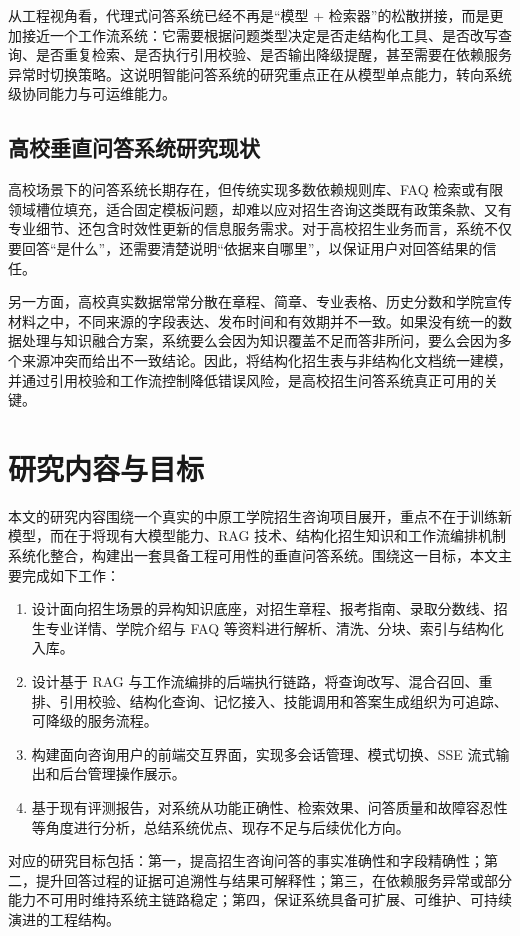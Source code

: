 \documentclass[UTF8,zihao=-4,oneside,fontset=windows]{ctexbook}
\numberwithin{equation}{chapter}
\begin{document}
从工程视角看，代理式问答系统已经不再是“模型 + 检索器”的松散拼接，而是更加接近一个工作流系统：它需要根据问题类型决定是否走结构化工具、是否改写查询、是否重复检索、是否执行引用校验、是否输出降级提醒，甚至需要在依赖服务异常时切换策略。这说明智能问答系统的研究重点正在从模型单点能力，转向系统级协同能力与可运维能力。

\subsection{高校垂直问答系统研究现状}
高校场景下的问答系统长期存在，但传统实现多数依赖规则库、FAQ 检索或有限领域槽位填充，适合固定模板问题，却难以应对招生咨询这类既有政策条款、又有专业细节、还包含时效性更新的信息服务需求。对于高校招生业务而言，系统不仅要回答“是什么”，还需要清楚说明“依据来自哪里”，以保证用户对回答结果的信任。

另一方面，高校真实数据常常分散在章程、简章、专业表格、历史分数和学院宣传材料之中，不同来源的字段表达、发布时间和有效期并不一致。如果没有统一的数据处理与知识融合方案，系统要么会因为知识覆盖不足而答非所问，要么会因为多个来源冲突而给出不一致结论。因此，将结构化招生表与非结构化文档统一建模，并通过引用校验和工作流控制降低错误风险，是高校招生问答系统真正可用的关键。

\section{研究内容与目标}
本文的研究内容围绕一个真实的中原工学院招生咨询项目展开，重点不在于训练新模型，而在于将现有大模型能力、RAG 技术、结构化招生知识和工作流编排机制系统化整合，构建出一套具备工程可用性的垂直问答系统。围绕这一目标，本文主要完成如下工作：

\begin{enumerate}
  \item 设计面向招生场景的异构知识底座，对招生章程、报考指南、录取分数线、招生专业详情、学院介绍与 FAQ 等资料进行解析、清洗、分块、索引与结构化入库。
  \item 设计基于 RAG 与工作流编排的后端执行链路，将查询改写、混合召回、重排、引用校验、结构化查询、记忆接入、技能调用和答案生成组织为可追踪、可降级的服务流程。
  \item 构建面向咨询用户的前端交互界面，实现多会话管理、模式切换、SSE 流式输出和后台管理操作展示。
  \item 基于现有评测报告，对系统从功能正确性、检索效果、问答质量和故障容忍性等角度进行分析，总结系统优点、现存不足与后续优化方向。
\end{enumerate}

对应的研究目标包括：第一，提高招生咨询问答的事实准确性和字段精确性；第二，提升回答过程的证据可追溯性与结果可解释性；第三，在依赖服务异常或部分能力不可用时维持系统主链路稳定；第四，保证系统具备可扩展、可维护、可持续演进的工程结构。
\end{document}
